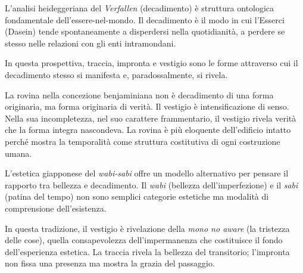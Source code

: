 L'analisi heideggeriana del \textit{Verfallen} (decadimento) \cite{heidegger1927} è struttura ontologica fondamentale dell'essere-nel-mondo. Il decadimento è il modo in cui l'Esserci (Dasein) tende spontaneamente a disperdersi nella quotidianità, a perdere se stesso nelle relazioni con gli enti intramondani.

In questa prospettiva, traccia, impronta e vestigio sono le forme attraverso cui il decadimento stesso si manifesta e, paradossalmente, si rivela. %


La rovina nella concezione benjaminiana \cite{benjamin1928} non è decadimento di una forma originaria, ma forma originaria di verità. Il vestigio è intensificazione di senso. Nella sua incompletezza, nel suo carattere frammentario, il vestigio rivela verità che la forma integra nascondeva. La rovina è più eloquente dell'edificio intatto perché mostra la temporalità come struttura costitutiva di ogni costruzione umana.


L'estetica giapponese del \textit{wabi-sabi} \cite{kuki1930} offre un modello alternativo per pensare il rapporto tra bellezza e decadimento. Il \textit{wabi} (bellezza dell'imperfezione) e il \textit{sabi} (patina del tempo) non sono semplici categorie estetiche ma modalità di comprensione dell'esistenza.

In questa tradizione, il vestigio è rivelazione della \textit{mono no aware} (la tristezza delle cose), quella consapevolezza dell'impermanenza che costituisce il fondo dell'esperienza estetica. La traccia rivela la bellezza del transitorio; l'impronta non fissa una presenza ma mostra la grazia del passaggio.

%

